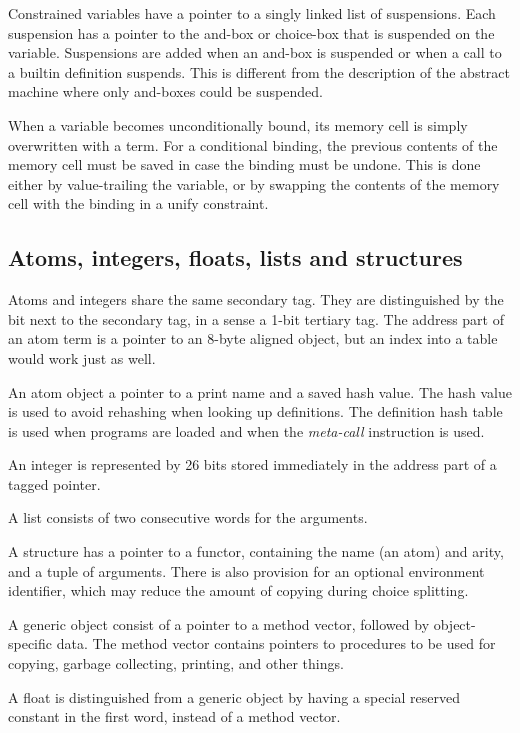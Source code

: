 Constrained variables have a pointer to a singly linked list of
suspensions.  Each suspension has a pointer to the and-box or
choice-box that is suspended on the variable. Suspensions are added
when an and-box is suspended or when a call to a builtin definition
suspends. This is different from the description of the abstract
machine where only and-boxes could be suspended.

When a variable becomes unconditionally bound, its memory cell is simply
overwritten with a term. For a conditional binding, the previous contents
of the memory cell must be saved in case the binding must be undone.
This is done either by value-trailing the variable, or by swapping the
contents of the memory cell with the binding in a unify constraint.


\subsection*{Atoms, integers, floats, lists and structures}

Atoms and integers share the same secondary tag. They are distinguished
by the bit next to the secondary tag, in a sense a 1-bit tertiary tag.
The address part of an atom term is a pointer to an 8-byte aligned object,
but an index into a table would work just as well.

An atom object a pointer to a print name and a saved hash value. The hash
value is used to avoid rehashing when looking up definitions. The definition
hash table is used when programs are loaded and when the {\em meta-call}
instruction is used.

An integer is represented by 26 bits stored immediately in the address part
of a tagged pointer.

A list consists of two consecutive words for the arguments.

A structure has a pointer to a functor, containing the name (an atom) and
arity, and a tuple of arguments. There is also provision for an optional
environment identifier, which may reduce the amount of copying during choice
splitting.

A generic object consist of a pointer to a method vector, followed by
object-specific data. The method vector contains pointers to procedures
to be used for copying, garbage collecting, printing, and other things.

A float is distinguished from a generic object by having a special reserved
constant in the first word, instead of a method vector.


